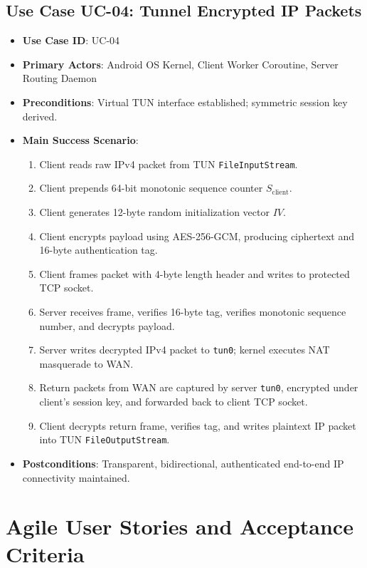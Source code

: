 \subsection{Use Case UC-04: Tunnel Encrypted IP Packets}
\begin{itemize}
    \item \textbf{Use Case ID}: UC-04
    \item \textbf{Primary Actors}: Android OS Kernel, Client Worker Coroutine, Server Routing Daemon
    \item \textbf{Preconditions}: Virtual TUN interface established; symmetric session key derived.
    \item \textbf{Main Success Scenario}:
    \begin{enumerate}
        \item Client reads raw IPv4 packet from TUN \texttt{FileInputStream}.
        \item Client prepends 64-bit monotonic sequence counter $S_{\text{client}}$.
        \item Client generates 12-byte random initialization vector $IV$.
        \item Client encrypts payload using AES-256-GCM, producing ciphertext and 16-byte authentication tag.
        \item Client frames packet with 4-byte length header and writes to protected TCP socket.
        \item Server receives frame, verifies 16-byte tag, verifies monotonic sequence number, and decrypts payload.
        \item Server writes decrypted IPv4 packet to \texttt{tun0}; kernel executes NAT masquerade to WAN.
        \item Return packets from WAN are captured by server \texttt{tun0}, encrypted under client's session key, and forwarded back to client TCP socket.
        \item Client decrypts return frame, verifies tag, and writes plaintext IP packet into TUN \texttt{FileOutputStream}.
    \end{enumerate}
    \item \textbf{Postconditions}: Transparent, bidirectional, authenticated end-to-end IP connectivity maintained.
\end{itemize}

\section{Agile User Stories and Acceptance Criteria}
\label{sec:user_stories}


